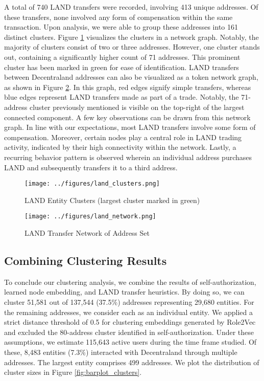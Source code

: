 \documentclass[12pt,a4paper,titlepage,oneside,english]{article}
\begin{document}
A total of 740 LAND transfers were recorded, involving 413 unique addresses. Of these transfers, none involved any form of compensation within the same transaction. Upon analysis, we were able to group these addresses into 161 distinct clusters. Figure \ref{fig:LAND_clusters} visualizes the clusters in a network graph. Notably, the majority of clusters consist of two or three addresses. However, one cluster stands out, containing a significantly higher count of 71 addresses. This prominent cluster has been marked in green for ease of identification. \newline
LAND transfers between Decentraland addresses can also be visualized as a token network graph, as shown in Figure \ref{fig:LAND_network}. In this graph, red edges signify simple transfers, whereas blue edges represent LAND transfers made as part of a trade. Notably, the 71-address cluster previously mentioned is visible on the top-right of the largest connected component. \newline
A few key observations can be drawn from this network graph. In line with our expectations, most LAND transfers involve some form of compensation. Moreover, certain nodes play a central role in LAND trading activity, indicated by their high connectivity within the network. Lastly, a recurring behavior pattern is observed wherein an individual address purchases LAND and subsequently transfers it to a third address.

\begin{figure}[h!]
	\centering
	\texttt{[image: ../figures/land\_clusters.png]}
	\caption{LAND Entity Clusters (largest cluster marked in green)}
	\label{fig:LAND_clusters}
\end{figure}

\begin{figure}[h!]
	\centering
	\texttt{[image: ../figures/land\_network.png]}
	\caption{LAND Transfer Network of Address Set}
	\label{fig:LAND_network}
\end{figure} 

\subsection{Combining Clustering Results}
To conclude our clustering analysis, we combine the results of self-authorization, learned node embedding, and LAND transfer heuristics. By doing so, we can cluster 51,581 out of 137,544 (37.5\%) addresses representing 29,680 entities. 
For the remaining addresses, we consider each as an individual entity. 
We applied a strict distance threshold of 0.5 for clustering embeddings generated by Role2Vec and excluded the 80-address cluster identified in self-authorization.
Under these assumptions, we estimate 115,643 active users during the time frame studied. Of these, 8,483 entities (7.3\%) interacted with Decentraland through multiple addresses. The largest entity comprises 499 addresses. We plot the distribution of cluster sizes in Figure \ref{fig:barplot_clusters}.
\end{document}
